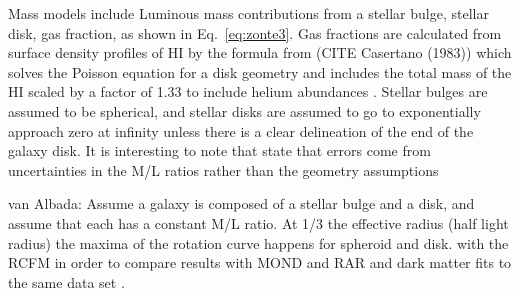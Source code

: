 \documentclass[reprint,%
 amsmath,amssymb,
 aps,
]{revtex4-1}
\begin{document}
   Mass models include Luminous mass contributions from a stellar bulge, stellar disk, gas fraction, as shown in Eq.~\ref{eq:zonte3}. Gas fractions are calculated from surface density profiles of HI by the formula from (CITE Casertano (1983)) which solves the Poisson equation for a disk geometry and
   includes the total mass of the HI scaled by a factor of 1.33 to include helium abundances . Stellar bulges are assumed to be spherical, and stellar disks are assumed to go to exponentially approach zero at  infinity unless there is a clear delineation of the end of the galaxy disk. It is interesting to note that \citet{2016Lelli} state that errors come from uncertainties in the M/L ratios rather than the geometry assumptions
   
 
   
 
 

 
 van Albada: Assume a galaxy is composed of a stellar bulge and a disk, and assume that each has a constant M/L ratio. At 1/3 the effective radius (half light radius) the maxima of the rotation curve happens for spheroid and disk. 
   with  the RCFM in order to compare results with    MOND and RAR and dark matter fits to the same data set   \cite{McGaugh_2014,Li_2018}. 
\end{document}

